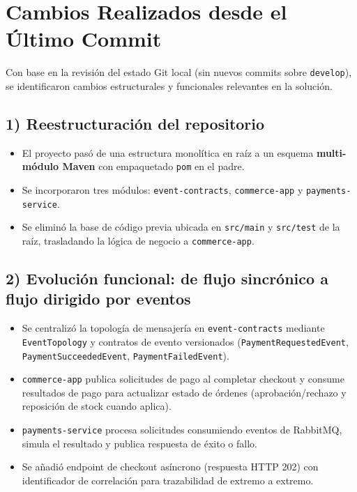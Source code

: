 \documentclass[12pt, a4paper]{article}
\begin{document}
\section{Cambios Realizados desde el Último Commit}
Con base en la revisión del estado Git local (sin nuevos commits sobre \texttt{develop}), se identificaron cambios estructurales y funcionales relevantes en la solución.

\subsection*{1) Reestructuración del repositorio}
\begin{itemize}
    \item El proyecto pasó de una estructura monolítica en raíz a un esquema \textbf{multi-módulo Maven} con empaquetado \texttt{pom} en el padre.
    \item Se incorporaron tres módulos: \texttt{event-contracts}, \texttt{commerce-app} y \texttt{payments-service}.
    \item Se eliminó la base de código previa ubicada en \texttt{src/main} y \texttt{src/test} de la raíz, trasladando la lógica de negocio a \texttt{commerce-app}.
\end{itemize}

\subsection*{2) Evolución funcional: de flujo sincrónico a flujo dirigido por eventos}
\begin{itemize}
    \item Se centralizó la topología de mensajería en \texttt{event-contracts} mediante \texttt{EventTopology} y contratos de evento versionados (\texttt{PaymentRequestedEvent}, \texttt{PaymentSucceededEvent}, \texttt{PaymentFailedEvent}).
    \item \texttt{commerce-app} publica solicitudes de pago al completar checkout y consume resultados de pago para actualizar estado de órdenes (aprobación/rechazo y reposición de stock cuando aplica).
    \item \texttt{payments-service} procesa solicitudes consumiendo eventos de RabbitMQ, simula el resultado y publica respuesta de éxito o fallo.
    \item Se añadió endpoint de checkout asíncrono (respuesta HTTP 202) con identificador de correlación para trazabilidad de extremo a extremo.
\end{itemize}
\end{document}
